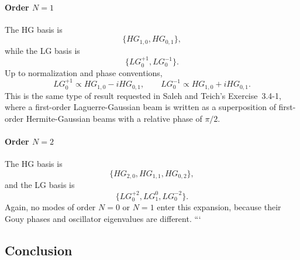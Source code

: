 \begin{resolucao}[Solution]
\paragraph*{Order $N=1$}
The HG basis is
\begin{equation}
    \{HG_{1,0},HG_{0,1}\},
\end{equation}
while the LG basis is
\begin{equation}
    \{LG_0^{+1},LG_0^{-1}\}.
\end{equation}
Up to normalization and phase conventions,
\begin{equation}
    LG_0^{+1}
    \propto
    HG_{1,0}
    -
    iHG_{0,1},
    \qquad
    LG_0^{-1}
    \propto
    HG_{1,0}
    +
    iHG_{0,1}.
    \label{eq:N1_example}
\end{equation}
This is the same type of result requested in Saleh and Teich's Exercise~3.4-1, where a first-order Laguerre-Gaussian beam is written as a superposition of first-order Hermite-Gaussian beams with a relative phase of $\pi/2$.

\paragraph*{Order $N=2$}
The HG basis is
\begin{equation}
    \{HG_{2,0},HG_{1,1},HG_{0,2}\},
\end{equation}
and the LG basis is
\begin{equation}
    \{LG_0^{+2},LG_1^0,LG_0^{-2}\}.
\end{equation}
Again, no modes of order $N=0$ or $N=1$ enter this expansion, because their Gouy phases and oscillator eigenvalues are different.
```

\subsection*{Conclusion}


\end{resolucao}
